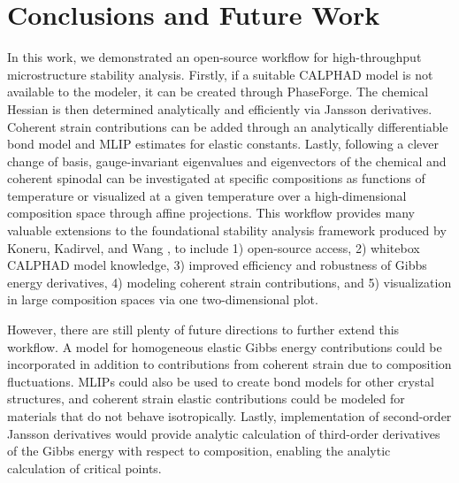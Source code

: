 \section{Conclusions and Future Work}

In this work, we demonstrated an open-source workflow for high-throughput microstructure stability analysis. Firstly, if a suitable CALPHAD model is not available to the modeler, it can be created through PhaseForge. The chemical Hessian is then determined analytically and efficiently via Jansson derivatives. Coherent strain contributions can be added through an analytically differentiable bond model and MLIP estimates for elastic constants. Lastly, following a clever change of basis, gauge-invariant eigenvalues and eigenvectors of the chemical and coherent spinodal can be investigated at specific compositions as functions of temperature or visualized at a given temperature over a high-dimensional composition space through affine projections. This workflow provides many valuable extensions to the foundational stability analysis framework produced by Koneru, Kadirvel, and Wang \cite{koneru2022high}, to include 1) open-source access, 2) whitebox CALPHAD model knowledge, 3) improved efficiency and robustness of Gibbs energy derivatives, 4) modeling coherent strain contributions, and 5) visualization in large composition spaces via one two-dimensional plot.

However, there are still plenty of future directions to further extend this workflow. A model for homogeneous elastic Gibbs energy contributions could be incorporated in addition to contributions from coherent strain due to composition fluctuations. MLIPs could also be used to create bond models for other crystal structures, and coherent strain elastic contributions could be modeled for materials that do not behave isotropically. Lastly, implementation of second-order Jansson derivatives would provide analytic calculation of third-order derivatives of the Gibbs energy with respect to composition, enabling the analytic calculation of critical points.
